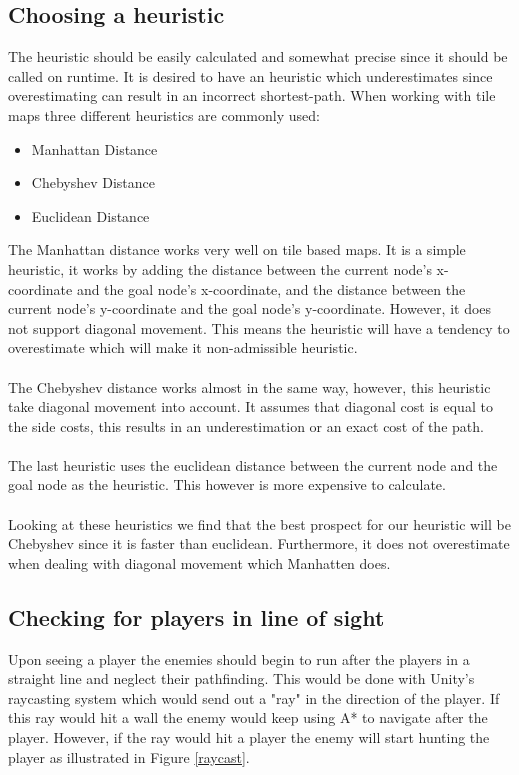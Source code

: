 \subsection*{Choosing a heuristic}
The heuristic should be easily calculated and somewhat precise since it should be called on runtime.
It is desired to have an heuristic which underestimates since overestimating can result in an incorrect shortest-path.
When working with tile maps three different heuristics are commonly used\cite{heuristics}:
\begin{itemize}
\item Manhattan Distance
\item Chebyshev Distance
\item Euclidean Distance
\end{itemize}
The Manhattan distance works very well on tile based maps. 
It is a simple heuristic, it works by adding the distance between the current node's x-coordinate and the goal node's x-coordinate, and the distance between the current node's y-coordinate and the goal node's y-coordinate.
However, it does not support diagonal movement. 
This means the heuristic will have a tendency to overestimate which will make it non-admissible heuristic.\\\\
The Chebyshev distance works almost in the same way, however, this heuristic take diagonal movement into account. 
It assumes that diagonal cost is equal to the side costs, this results in an underestimation or an exact cost of the path.\\\\
The last heuristic uses the euclidean distance between the current node and the goal node as the heuristic.
This however is more expensive to calculate.\\\\
Looking at these heuristics we find that the best prospect for our heuristic will be Chebyshev since it is faster than euclidean. 
Furthermore, it does not overestimate when dealing with diagonal movement which Manhatten does.

\subsection*{Checking for players in line of sight}
Upon seeing a player the enemies should begin to run after the players in a straight line and neglect their pathfinding. 
This would be done with Unity's raycasting system\cite{raycast} which would send out a "ray" in the direction of the player. 
If this ray would hit a wall the enemy would keep using A* to navigate after the player.
However, if the ray would hit a player the enemy will start hunting the player as illustrated in Figure \ref{raycast}.


